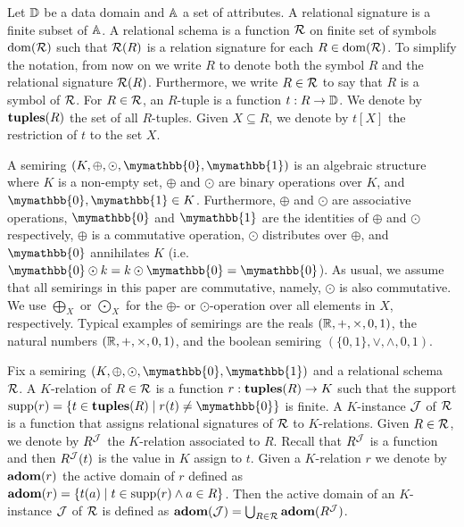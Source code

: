 \newcommand{\ksum}{\oplus}
\newcommand{\kprod}{\odot}
\newcommand{\bigksum}{\bigoplus}
\newcommand{\bigkprod}{\bigodot}
\newcommand{\kzero}{\mymathbb{0}}
\newcommand{\kone}{\mymathbb{1}}

\newcommand{\row}{\mathsf{row}}
\newcommand{\rows}{\mathsf{rows}}
\newcommand{\col}{\mathsf{col}}
\newcommand{\cols}{\mathsf{cols}}


Let $\mathbb{D}$ be a data domain and $\mathbb{A}$ a set of attributes. A relational signature is a finite subset of $\mathbb{A}$. A relational schema is a function $\mathcal{R}$ on finite set of symbols $\operatorname{dom}(\mathcal{R})$ such that $\mathcal{R}(R)$ is a relation signature for each $R \in \operatorname{dom}(\mathcal{R})$. To simplify the notation, from now on we write $R$ to denote both the symbol $R$ and the relational signature $\mathcal{R}(R)$.
Furthermore, we write $R \in \mathcal{R}$ to say that $R$ is a symbol of $\mathcal{R}$. 
For $R \in \mathcal{R}$, an $R$-tuple is a function $t: R \rightarrow \mathbb{D}$. We denote by $\mathbf{tuples}(R)$ the set of all $R$-tuples. Given $X \subseteq R$, we denote by $t[X]$ the restriction of $t$ to the set $X$.

A semiring $(K, \ksum, \kprod, \kzero, \kone)$ is an algebraic structure where $K$ is a non-empty set, $\ksum$ and $\kprod$ are binary operations over $K$, and $\kzero, \kone \in K$. Furthermore,  $\ksum$ and $\kprod$ are associative operations, $\kzero$ and $\kone$ are the identities of $\ksum$ and $\kprod$ respectively, $\ksum$ is a commutative operation, $\kprod$ distributes over $\ksum$, and $\kzero$ annihilates $K$ (i.e. $\kzero \kprod k = k \kprod \kzero = \kzero$). As usual, we assume that all semirings in this paper are commutative, namely, $\kprod$ is also commutative. We use $\bigksum_X$ or $\bigkprod_X$ for the $\ksum$- or $\kprod$-operation over all elements in $X$, respectively. Typical examples of semirings are the reals $(\mathbb{R}, +, \times, 0,1)$, the natural numbers $(\mathbb{R}, +, \times, 0,1)$, and the boolean semiring $(\{0,1\}, \vee, \wedge, 0, 1)$. 

Fix a semiring $(K, \ksum, \kprod, \kzero, \kone)$ and a relational schema $\mathcal{R}$. A $K$-relation of $R \in \mathcal{R}$ is a function $r: \mathbf{tuples}(R) \rightarrow K$ such that the support  $\supp(r) = \{t \in \tuples(R) \mid r(t) \neq \kzero\}$ is finite. 
A $K$-instance $\mathcal{J}$ of $\mathcal{R}$ is a function that assigns relational signatures of $\mathcal{R}$ to $K$-relations. Given $R \in \mathcal{R}$, we denote by $R^{\mathcal{J}}$ the $K$-relation associated to $R$. Recall that $R^{\mathcal{J}}$ is a function and then $R^{\mathcal{J}}(t)$ is the value in $K$ assign to $t$. 
Given a $K$-relation $r$ we denote by $\mathbf{adom}(r)$ the active domain of $r$ defined as $\mathbf{adom}(r) = \{t(a) \mid t \in \operatorname{supp}(r) \wedge a \in R\}$.
Then the active domain of an $K$-instance $\mathcal{J}$ of $\mathcal{R}$ is defined as $\mathbf{adom}(\mathcal{J}) = \bigcup_{R \in \mathcal{R}} \mathbf{adom}(R^{\mathcal{J}})$. 

